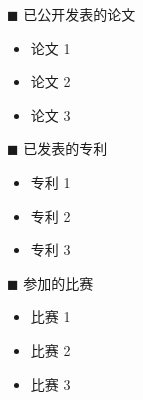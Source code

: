 \begin{center}
  \large\bfseries{}
\end{center}
\vskip 5mm

{\heiti $\blacksquare$ 已公开发表的论文}\vskip 5mm

\begin{itemize}
  \item 论文 1
  \item 论文 2
  \item 论文 3
\end{itemize}

\bigskip\bigskip

{\heiti $\blacksquare$ 已发表的专利}\vskip 5mm

\begin{itemize}
  \item 专利 1
  \item 专利 2
  \item 专利 3
\end{itemize}

\bigskip\bigskip

{\heiti $\blacksquare$ 参加的比赛}\vskip 5mm

\begin{itemize}
  \item 比赛 1
  \item 比赛 2
  \item 比赛 3
\end{itemize}
